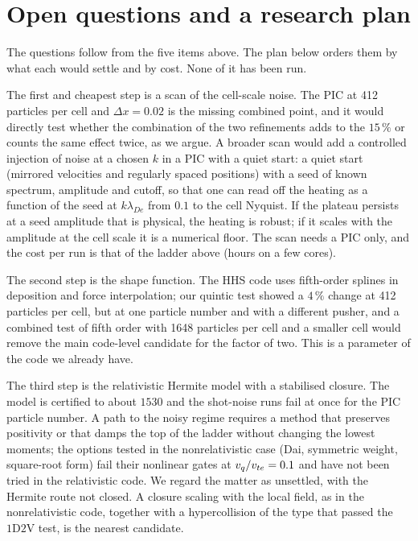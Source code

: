 \section{Open questions and a research plan}

The questions follow from the five items above. The plan below orders them by what each would settle and by cost. None of it has been run.

The first and cheapest step is a scan of the cell-scale noise. The PIC at 412 particles per cell and $\Delta x=0.02$ is the missing combined point, and it would directly test whether the combination of the two refinements adds to the $15\,\%$ or counts the same effect twice, as we argue. A broader scan would add a controlled injection of noise at a chosen $k$ in a PIC with a quiet start: a quiet start (mirrored velocities and regularly spaced positions) with a seed of known spectrum, amplitude and cutoff, so that one can read off the heating as a function of the seed at $k\lambda_{De}$ from $0.1$ to the cell Nyquist. If the plateau persists at a seed amplitude that is physical, the heating is robust; if it scales with the amplitude at the cell scale it is a numerical floor. The scan needs a PIC only, and the cost per run is that of the ladder above (hours on a few cores).

The second step is the shape function. The HHS code uses fifth-order splines in deposition and force interpolation; our quintic test showed a $4\,\%$ change at 412 particles per cell, but at one particle number and with a different pusher, and a combined test of fifth order with 1648 particles per cell and a smaller cell would remove the main code-level candidate for the factor of two. This is a parameter of the code we already have.

The third step is the relativistic Hermite model with a stabilised closure. The model is certified to about $1530$ and the shot-noise runs fail at once for the PIC particle number. A path to the noisy regime requires a method that preserves positivity or that damps the top of the ladder without changing the lowest moments; the options tested in the nonrelativistic case (Dai, symmetric weight, square-root form) fail their nonlinear gates at $v_q/v_{te}=0.1$ and have not been tried in the relativistic code. We regard the matter as unsettled, with the Hermite route not closed. A closure scaling with the local field, as in the nonrelativistic code, together with a hypercollision of the type that passed the $1\mathrm{D}2\mathrm{V}$ test, is the nearest candidate.

